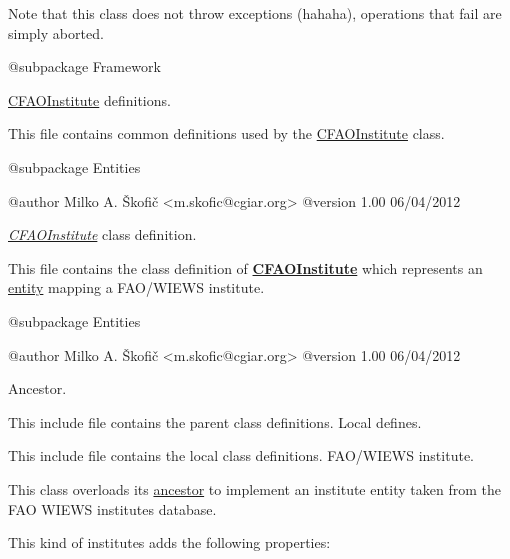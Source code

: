 Note that this class does not throw exceptions (hahaha), operations that fail are simply aborted.

\begin{DoxyVerb} @subpackage        Framework\end{DoxyVerb}


\hyperlink{class_c_f_a_o_institute}{C\-F\-A\-O\-Institute} definitions.

This file contains common definitions used by the \hyperlink{class_c_f_a_o_institute}{C\-F\-A\-O\-Institute} class.

\begin{DoxyVerb} @subpackage        Entities

 @author            Milko A. Škofič <m.skofic@cgiar.org>
 @version   1.00 06/04/2012\end{DoxyVerb}


{\itshape \hyperlink{class_c_f_a_o_institute}{C\-F\-A\-O\-Institute}} class definition.

This file contains the class definition of {\bfseries \hyperlink{class_c_f_a_o_institute}{C\-F\-A\-O\-Institute}} which represents an \hyperlink{class_c_entity}{entity} mapping a F\-A\-O/\-W\-I\-E\-W\-S institute.

\begin{DoxyVerb} @subpackage        Entities

 @author            Milko A. Škofič <m.skofic@cgiar.org>
 @version   1.00 06/04/2012\end{DoxyVerb}


Ancestor.

This include file contains the parent class definitions. Local defines.

This include file contains the local class definitions. F\-A\-O/\-W\-I\-E\-W\-S institute.

This class overloads its \hyperlink{class_c_institute}{ancestor} to implement an institute entity taken from the F\-A\-O W\-I\-E\-W\-S institutes database.

This kind of institutes adds the following properties\-:


